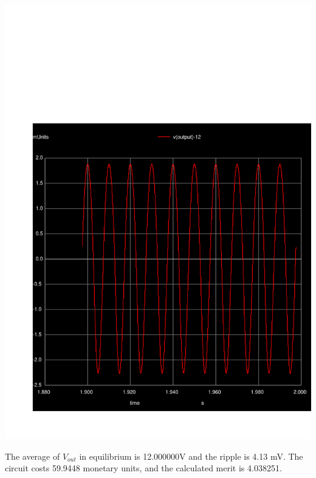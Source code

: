 \begin{minipage}[c]{0.50\linewidth}
\includegraphics[width=1\linewidth]{../sim/v12.pdf}
\end{minipage}
    
The average of $V_{out}$ in equilibrium is 12.000000V and the ripple is 4.13 mV. The circuit costs 59.9448 monetary units, and the calculated merit is 4.038251.
